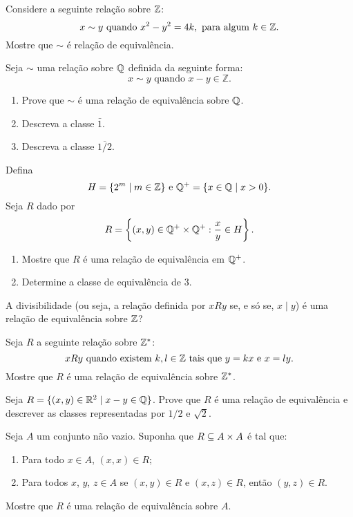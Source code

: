 \documentclass[12pt]{exam}
\begin{document}
\vspace{.3cm}

\questao{} Considere a seguinte rela\c{c}\~ao sobre $\mathbb{Z}$:
\[
    x \sim y \mbox{ quando }  x^2 - y^2 = 4k, \mbox{ para algum } k \in \mathbb{Z}.
\]
Mostre que $\sim$ {\'e} rela{\c c}{\~a}o de equival{\^e}ncia.
\vspace{.3cm}

\questao{} Seja $\sim$ uma rela{\c c}{\~a}o sobre $\mathbb{Q}$ definida da seguinte forma:
\[
    x \sim y \mbox{ quando } x - y \in \mathbb{Z}.
\]
\begin{enumerate}[label={\alph*})]
    \item Prove que $\sim$ {\'e} uma rela{\c c}{\~a}o de equival{\^e}ncia sobre $\mathbb{Q}$.
    \item Descreva a classe $\bar{1}$.
    \item Descreva a classe $\overline{1/2}$.
\end{enumerate}

\vspace{.3cm}

\questao{} Defina
\[
    H = \{2^m \mid m \in \mathbb{Z}\} \mbox{ e } \mathbb{Q}^+ = \{x \in \mathbb{Q} \mid x > 0\}.
\]
Seja $R$ dado por
\[
    R = \left\{(x,y) \in \mathbb{Q}^+\times \mathbb{Q}^+ : \frac{x}{y} \in H\right\}.
\]
\begin{enumerate}[label={\alph*})]
    \item Mostre que $R$ \'e uma rela\c{c}\~ao de equival\^encia em $\mathbb{Q}^+$.
    \item Determine a classe de equival\^encia de $3$.
\end{enumerate}
\vspace{.3cm}

\questao{} A divisibilidade (ou seja, a rela{\c c}{\~a}o definida por $xRy$ se, e s{\'o}
se, $x \mid y$) {\'e} uma rela{\c c}{\~a}o de equival{\^e}ncia sobre $\mathbb{Z}$?

\vspace{.3cm}

\questao{} Seja $R$ a seguinte rela{\c c}{\~a}o sobre $\mathbb{Z}^*$:
\[
    x R y \mbox{ quando existem }  k, l \in \mathbb{Z} \mbox{ tais que } y = kx \mbox{ e } x = ly.
\]
Mostre que $R$ {\'e} uma rela{\c c}{\~a}o de equival{\^e}ncia sobre $\mathbb{Z}^*$.

\vspace{.3cm}

\questao{} Seja $R = \{ (x, y) \in \mathbb{R}^2 \mid x - y \in \mathbb{Q}\}$. Prove que $R$ {\'e} uma rela{\c c}{\~a}o de equival{\^e}ncia e descrever as classes representadas por $1/2$ e $\sqrt{2}$.

\vspace{.3cm}

\questao{} Seja $A$ um conjunto n\~ao vazio. Suponha que $R \subseteq A \times A$ \'e tal que:
\begin{enumerate}[label={\alph*})]
    \item Para todo $x \in A$, $(x,x) \in R$;
    \item Para todos $x$, $y$, $z \in A$ se $(x, y) \in R$ e $(x,z) \in R$, ent\~ao $(y,z) \in R$.
\end{enumerate}
Mostre que $R$ \'e uma rela\c{c}\~ao de equival\^encia sobre $A$.
\end{document}
